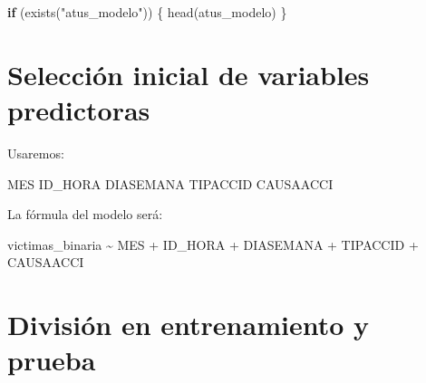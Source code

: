 \documentclass[
  11pt,
  letterpaper,
]{book}
\newenvironment{Shaded}{\begin{snugshade}}{\end{snugshade}}
\newcommand{\ControlFlowTok}[1]{\textcolor[rgb]{0.00,0.23,0.31}{\textbf{#1}}}
\newcommand{\FunctionTok}[1]{\textcolor[rgb]{0.28,0.35,0.67}{#1}}
\newcommand{\NormalTok}[1]{\textcolor[rgb]{0.00,0.23,0.31}{#1}}
\newcommand{\SpecialCharTok}[1]{\textcolor[rgb]{0.37,0.37,0.37}{#1}}
\newcommand{\StringTok}[1]{\textcolor[rgb]{0.13,0.47,0.30}{#1}}
\begin{document}
\begin{Shaded}
\begin{Highlighting}[]
\ControlFlowTok{if}\NormalTok{ (}\FunctionTok{exists}\NormalTok{(}\StringTok{"atus\_modelo"}\NormalTok{)) \{}
  \FunctionTok{head}\NormalTok{(atus\_modelo)}
\NormalTok{\}}
\end{Highlighting}
\end{Shaded}

\begin{Shaded}
\end{Shaded}

\section{Selección inicial de variables
predictoras}\label{selecciuxf3n-inicial-de-variables-predictoras}

Usaremos:

\begin{Shaded}
\begin{Highlighting}[]
\NormalTok{MES}
\NormalTok{ID\_HORA}
\NormalTok{DIASEMANA}
\NormalTok{TIPACCID}
\NormalTok{CAUSAACCI}
\end{Highlighting}
\end{Shaded}

La fórmula del modelo será:

\begin{Shaded}
\begin{Highlighting}[]
\NormalTok{victimas\_binaria \textasciitilde{} MES + ID\_HORA + DIASEMANA + TIPACCID + CAUSAACCI}
\end{Highlighting}
\end{Shaded}

\section{División en entrenamiento y
prueba}\label{divisiuxf3n-en-entrenamiento-y-prueba}
\end{document}
